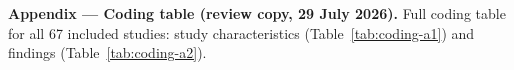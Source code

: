\documentclass[12pt, a4paper]{report}
\begin{document}
\noindent\textbf{Appendix — Coding table (review copy, 29 July 2026).}
Full coding table for all 67 included studies: study characteristics
(Table~\ref{tab:coding-a1}) and findings (Table~\ref{tab:coding-a2}).


\end{document}
